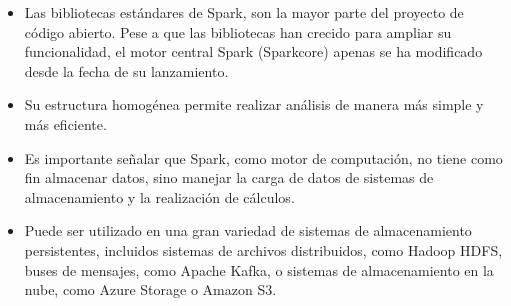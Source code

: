\begin{itemize}
\item Las bibliotecas estándares de Spark, son la mayor parte del proyecto de código abierto. Pese a que las bibliotecas han crecido para ampliar su funcionalidad, el motor central Spark (Sparkcore) apenas se ha modificado desde la fecha de su lanzamiento.\\

\item Su estructura homogénea permite realizar análisis de manera más simple y más eficiente.\\

\item Es importante señalar que Spark, como motor de computación, no tiene como fin almacenar datos, sino manejar la carga de datos de sistemas de almacenamiento y la realización de cálculos.\\

\item Puede ser utilizado en una gran variedad de sistemas de almacenamiento persistentes, incluidos sistemas de archivos distribuidos, como Hadoop HDFS, buses de mensajes, como Apache Kafka, o sistemas de almacenamiento en la nube, como Azure Storage o Amazon S3.\\

\end{itemize}

